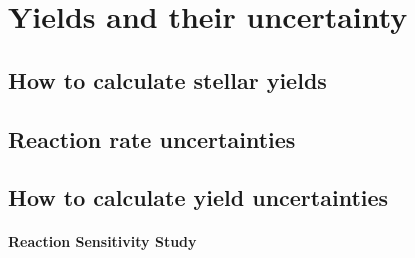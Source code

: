 \chapter{Yields and their uncertainty}

\section{How to calculate stellar yields}

\section{Reaction rate uncertainties}

\section{How to calculate yield uncertainties}

\subsubsection{Reaction Sensitivity Study}
